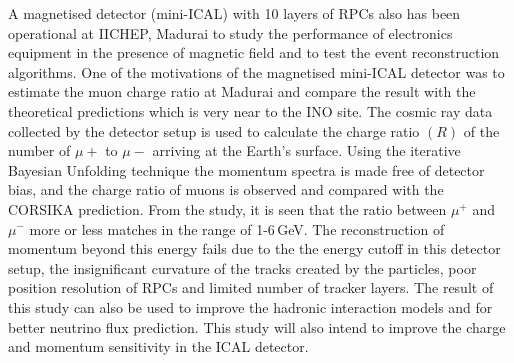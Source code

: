 A magnetised detector (mini-ICAL) with 10 layers of RPCs also has been
operational at IICHEP, Madurai to study the performance of electronics
equipment in the presence of magnetic field and to test the event
reconstruction algorithms. One of the motivations of the magnetised
mini-ICAL detector was to estimate the muon charge ratio at Madurai
and compare the result with the theoretical predictions which is very
near to the INO site.
The cosmic ray data collected by the detector setup is used to
calculate the charge ratio $(R)$ of the number of $\mu+$ to $\mu-$
arriving at the Earth's surface. Using the iterative Bayesian
Unfolding technique the momentum spectra is made free of detector
bias, and the charge ratio of muons is observed and compared with the
CORSIKA prediction.
From the study, it is seen that the ratio between $\mu^{+}$ and
$\mu^{-}$ more or less matches in the range of 1-6\,GeV.
The reconstruction of momentum beyond this energy fails due to
the the energy cutoff in this detector setup, the insignificant
curvature of the tracks created by the particles, poor position
resolution of RPCs and limited number of tracker layers. The result
of this study can also be used to improve the hadronic interaction
models and for better neutrino flux prediction. This study will
also intend to improve the charge and momentum sensitivity in the
ICAL detector.
